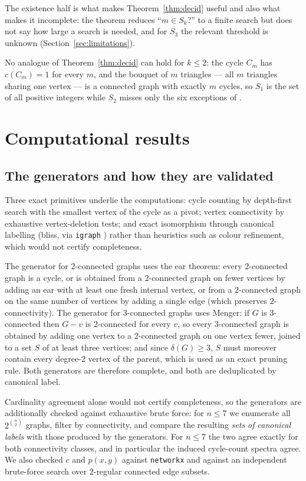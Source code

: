 \documentclass[11pt,a4paper]{article}
\theoremstyle{definition}
\begin{document}
The existence half is what makes Theorem~\ref{thm:decid} useful and also what
makes it incomplete: the theorem reduces ``$m\in S_k$?'' to a finite search
but does not say how large a search is needed, and for $S_3$ the relevant
threshold is unknown (Section~\ref{sec:limitations}).

No analogue of Theorem~\ref{thm:decid} can hold for $k\le 2$: the cycle $C_m$
has $c(C_m)=1$ for every $m$, and the bouquet of $m$ triangles --- all $m$
triangles sharing one vertex --- is a connected graph with exactly $m$ cycles,
so $S_1$ is the set of all positive integers while $S_2$ misses only the six
exceptions of \cite{mcculloch2026}.

\section{Computational results}\label{sec:comp}

\subsection{The generators and how they are validated}

Three exact primitives underlie the computations: cycle counting by
depth-first search with the smallest vertex of the cycle as a pivot; vertex
connectivity by exhaustive vertex-deletion tests; and exact isomorphism
through canonical labelling (bliss, via \texttt{igraph} \cite{igraph}) rather
than heuristics such as colour refinement, which would not certify
completeness.

The generator for $2$-connected graphs uses the ear theorem: every
$2$-connected graph is a cycle, or is obtained from a $2$-connected graph on
fewer vertices by adding an ear with at least one fresh internal vertex, or from
a $2$-connected graph on the same number of vertices by adding a single edge
(which preserves $2$-connectivity).  The generator for $3$-connected graphs
uses Menger: if $G$ is $3$-connected then $G-v$ is $2$-connected for every $v$,
so every $3$-connected graph is obtained by adding one vertex to a
$2$-connected graph on one vertex fewer, joined to a set $S$ of at least three
vertices; and since $\delta(G)\ge 3$, $S$ must moreover contain every
degree-$2$ vertex of the parent, which is used as an exact pruning rule.  Both
generators are therefore complete, and both are deduplicated by canonical
label.

Cardinality agreement alone would not certify completeness, so the generators
are additionally checked against exhaustive brute force: for $n\le 7$ we
enumerate all $2^{\binom n2}$ graphs, filter by connectivity, and compare the
resulting \emph{sets of canonical labels} with those produced by the
generators.  For $n\le 7$ the two agree exactly for both connectivity classes,
and in particular the induced cycle-count spectra agree.  We also checked $c$
and $p(x,y)$ against \texttt{networkx} and against an independent brute-force
search over $2$-regular connected edge subsets.
\end{document}
